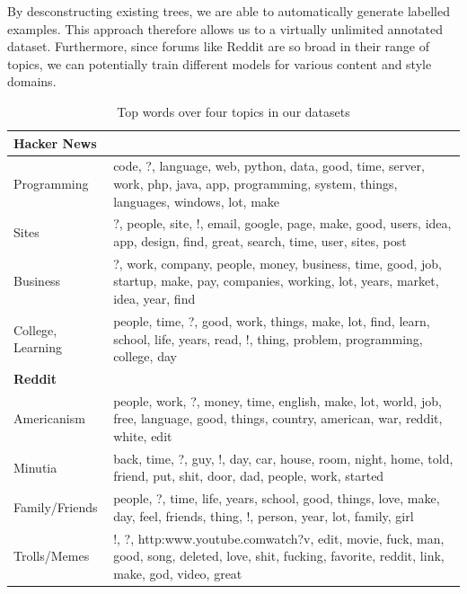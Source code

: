 \documentclass{article}
\begin{document}
By desconstructing existing trees, we are able to automatically generate
labelled examples. This approach therefore allows us to a virtually unlimited
annotated dataset. Furthermore, since forums like Reddit are so broad in their
range of topics, we can potentially train different models for various content
and style domains.

\begin{table}[ht]\footnotesize
  \begin{tabularx}{0.5\textwidth}{| l X |}
   \hline
   \textbf{Hacker News} & \\
   \hline
   Programming  & code, ?, language, web, python, data, good, time, server, work, php, java, app, programming, system, things, languages, windows, lot, make \\

  Sites  & ?, people, site, !, email, google, page, make, good, users, idea, app, design, find, great, search, time, user, sites, post \\

  Business  & ?, work, company, people, money, business, time, good, job, startup, make, pay, companies, working, lot, years, market, idea, year, find \\

  College,  Learning  & people, time, ?, good, work, things, make, lot, find, learn, school, life, years, read, !, thing, problem, programming, college, day \\
   \hline
   \textbf{Reddit} & \\
   \hline
  Americanism & people, work, ?, money, time, english, make, lot, world, job, free, language, good, things, country, american, war, reddit, white, edit \\

  Minutia & back, time, ?, guy, !, day, car, house, room, night, home, told, friend, put, shit, door, dad, people, work, started \\

  Family/Friends  & people, ?, time, life, years, school, good, things, love, make, day, feel, friends, thing, !, person, year, lot, family, girl \\

  Trolls/Memes  & !, ?, http:\/\/www.youtube.com\/watch?v, edit, movie, fuck, man, good, song, deleted, love, shit, fucking, favorite, reddit, link, make, god, video, great \\
   \hline
  \end{tabularx}
  \caption{Top words over four topics in our datasets}
  \label{table:lda}
\end{table}
\end{document}
